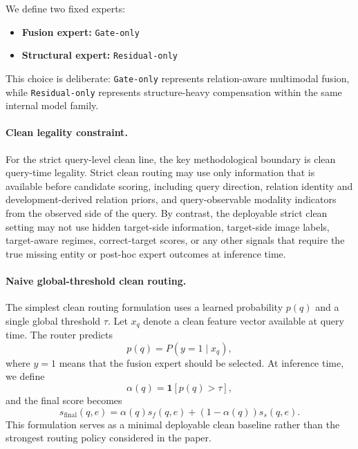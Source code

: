 \documentclass[11pt]{article}
\begin{document}
We define two fixed experts:
\begin{itemize}
    \item \textbf{Fusion expert:} \texttt{Gate-only}
    \item \textbf{Structural expert:} \texttt{Residual-only}
\end{itemize}

This choice is deliberate: \texttt{Gate-only} represents relation-aware multimodal fusion, while \texttt{Residual-only} represents structure-heavy compensation within the same internal model family.

\paragraph{Clean legality constraint.} For the strict query-level clean line, the key methodological boundary is clean query-time legality. Strict clean routing may use only information that is available before candidate scoring, including query direction, relation identity and development-derived relation priors, and query-observable modality indicators from the observed side of the query. By contrast, the deployable strict clean setting may not use hidden target-side information, target-side image labels, target-aware regimes, correct-target scores, or any other signals that require the true missing entity or post-hoc expert outcomes at inference time.

\paragraph{Naive global-threshold clean routing.} The simplest clean routing formulation uses a learned probability $p(q)$ and a single global threshold $\tau$. Let $x_q$ denote a clean feature vector available at query time. The router predicts
\[
p(q)=P(y=1\mid x_q),
\]
where $y=1$ means that the fusion expert should be selected. At inference time, we define
\[
\alpha(q)=\mathbf{1}[p(q)>\tau],
\]
and the final score becomes
\[
s_{\text{final}}(q,e)=\alpha(q)s_f(q,e)+(1-\alpha(q))s_s(q,e).
\]
This formulation serves as a minimal deployable clean baseline rather than the strongest routing policy considered in the paper.
\end{document}
